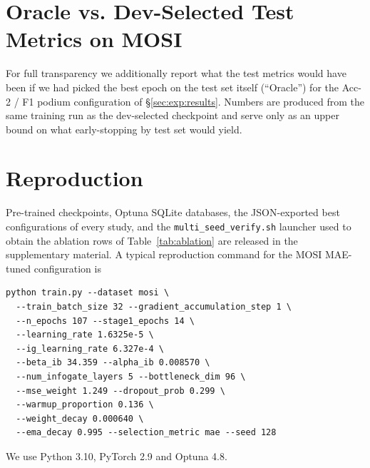 \section{Oracle vs. Dev-Selected Test Metrics on MOSI}
\label{appx:oracle}

For full transparency we additionally report what the test metrics
would have been if we had picked the best epoch on the test set
itself (``Oracle'') for the Acc-2 / F1 podium configuration of
\S\ref{sec:exp:results}.
Numbers are produced from the same training run as the dev-selected
checkpoint and serve only as an upper bound on what early-stopping by
test set would yield.

\begin{table}[h]
\centering
\caption{Dev-selected vs.\ oracle test metrics for the MOSI Acc-tuned
trial (msew35\_s2 trial 69).}
\label{tab:oracle}
\end{table}

\section{Reproduction}
\label{appx:repro}

Pre-trained checkpoints, Optuna SQLite databases, the JSON-exported
best configurations of every study, and the \texttt{multi\_seed\_verify.sh}
launcher used to obtain the ablation rows of
Table~\ref{tab:ablation} are released in the supplementary material.
A typical reproduction command for the MOSI MAE-tuned configuration is
{\small
\begin{verbatim}
python train.py --dataset mosi \
  --train_batch_size 32 --gradient_accumulation_step 1 \
  --n_epochs 107 --stage1_epochs 14 \
  --learning_rate 1.6325e-5 \
  --ig_learning_rate 6.327e-4 \
  --beta_ib 34.359 --alpha_ib 0.008570 \
  --num_infogate_layers 5 --bottleneck_dim 96 \
  --mse_weight 1.249 --dropout_prob 0.299 \
  --warmup_proportion 0.136 \
  --weight_decay 0.000640 \
  --ema_decay 0.995 --selection_metric mae --seed 128
\end{verbatim}
}
We use Python 3.10, PyTorch 2.9 and Optuna 4.8.
